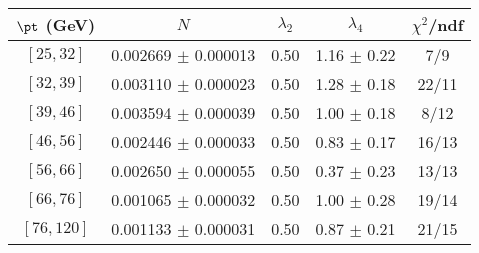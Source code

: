 \begin{tabular}{c||c|c|c|c}
$\pt$ (GeV) & $N$ & $\lambda_{2}$ & $\lambda_4$  & $\chi^2$/ndf  \\
\hline
$[25, 32]$ & 0.002669 $\pm$ 0.000013 & 0.50 & 1.16 $\pm$ 0.22 & 7/9\\
$[32, 39]$ & 0.003110 $\pm$ 0.000023 & 0.50 & 1.28 $\pm$ 0.18 & 22/11\\
$[39, 46]$ & 0.003594 $\pm$ 0.000039 & 0.50 & 1.00 $\pm$ 0.18 & 8/12\\
$[46, 56]$ & 0.002446 $\pm$ 0.000033 & 0.50 & 0.83 $\pm$ 0.17 & 16/13\\
$[56, 66]$ & 0.002650 $\pm$ 0.000055 & 0.50 & 0.37 $\pm$ 0.23 & 13/13\\
$[66, 76]$ & 0.001065 $\pm$ 0.000032 & 0.50 & 1.00 $\pm$ 0.28 & 19/14\\
$[76, 120]$ & 0.001133 $\pm$ 0.000031 & 0.50 & 0.87 $\pm$ 0.21 & 21/15\\
\end{tabular}
